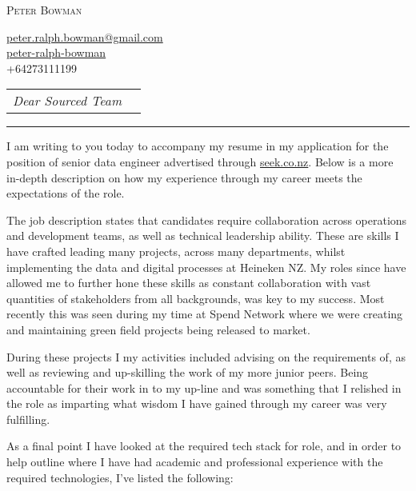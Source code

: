 \documentclass[10pt,A4]{article}
\newcommand{\metasection}[2]
{
\footnotesize{#2} \hspace*{\fill} \footnotesize{#1}\\[1pt]
}
\newcommand{\businessname}{Sourced}
\newcommand{\jobadlink}{\href{https://www.seek.co.nz/job/74255806?ref=search-standalone&type=standout\#sol=ff2934c461a7cf10b7aa14ecdf438175c4949599}{seek.co.nz}}
\newcommand{\nzcontact}
{
\metasection{}{\faIcon{phone-square-alt} +64273111199}
}
\begin{document}
\pagestyle{fancy}

\vspace{-8pt}
\begin{flushleft}
	\large \textsc{Peter Bowman}
\end{flushleft}
\metasection{}{ \href{mailto:peter.ralph.bowman@gmail.com}{peter.ralph.bowman@gmail.com} }
\metasection{}{ \href{https://www.linkedin.com/in/peter-ralph-bowman/}{peter-ralph-bowman} }
\nzcontact{}
\normalsize
\vspace{32pt}

\begin{tabular*}{1\textwidth}{p{13.6cm}  x{3.9cm}}
	\textit{Dear \businessname{} Team}
\end{tabular*}

\vspace{-8pt}
\textcolor{ubersoftcol}{\hrule}

\vspace{3pt}
\vspace{12pt}
%
I am writing to you today to accompany my resume in my application for the position of senior data engineer advertised through \jobadlink{}.
Below is a more in-depth description on how my experience through my career meets the expectations of the role.
\par \vspace{4pt}
\par \vspace{12pt}
\par \vspace{4pt}
The job description states that candidates require collaboration across operations and development teams, as well as technical leadership ability. These are skills I have crafted leading many projects, across many departments, whilst implementing the data and digital processes at Heineken NZ. My roles since have allowed me to further hone these skills as constant collaboration with vast quantities of stakeholders from all backgrounds, was key to my success. Most recently this was seen during my time at Spend Network where we were creating and maintaining green field projects being released to market.
%
\par \vspace{8pt}
During these projects I my activities included advising on the requirements of, as well as reviewing and up-skilling the work of my more junior peers. Being accountable for their work in to my up-line and was something that I relished in the role as imparting what wisdom I have gained through my career was very fulfilling.
%
\par \vspace{8pt}
As a final point I have looked at the required tech stack for role, and in order to help outline where I have had academic and professional experience with the required technologies, I've listed the following:
\end{document}
